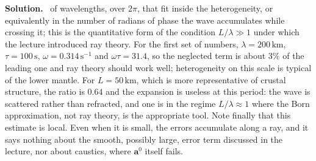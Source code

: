 \documentclass[a4paper,12pt]{paper}
\newenvironment{solution}{\par\noindent\textbf{Solution.}\ }{\par\medskip}
\begin{document}
\begin{solution}
of wavelengths, over $2\pi$, that fit inside the heterogeneity, or equivalently in the number of
radians of phase the wave accumulates while crossing it; this is the quantitative form of the
condition $L/\lambda\gg1$ under which the lecture introduced ray theory. For the first set of
numbers, $\lambda=200\,\mathrm{km}$, $\tau=100\,\mathrm{s}$, $\omega=0.314\,\mathrm{s^{-1}}$ and
$\omega\tau=31.4$, so the neglected term is about $3\%$ of the leading one and ray theory should
work well; heterogeneity on this scale is typical of the lower mantle. For $L=50\,\mathrm{km}$,
which is more representative of crustal structure, the ratio is $0.64$ and the expansion is
useless at this period: the wave is scattered rather than refracted, and one is in the regime
$L/\lambda\approx1$ where the Born approximation, not ray theory, is the appropriate tool.
Note finally that this estimate is local. Even when it is small, the errors accumulate along a
ray, and it says nothing about the smooth, possibly large, error term discussed in the lecture,
nor about caustics, where $\mathbf{a}^{0}$ itself fails.
\end{solution}
\end{document}
